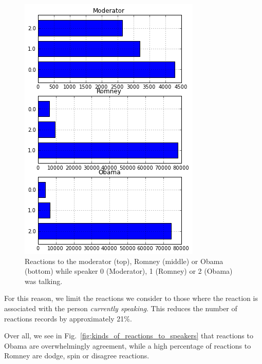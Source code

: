 \begin{figure}[]
	\centering
	\includegraphics[scale=0.5]{Figures/reactions_while_others_are_talking}
	\caption{Reactions to the moderator (top), Romney (middle) or Obama (bottom) while speaker 0 (Moderator), 1 (Romney) or 2 (Obama) was talking.}
	\label{fig:reacts_while_others_talk}
\end{figure}

For this reason, we limit the reactions we consider to those where the reaction is associated with the person \emph{currently speaking}.  This reduces the 	number of reactions records by approximately 21\%.

Over all, we see in Fig.~\ref{fig:kinds_of_reactions_to_speakers} that reactions to Obama are overwhelmingly agreement, while a high percentage of reactions to Romney are dodge, spin or disagree reactions.

